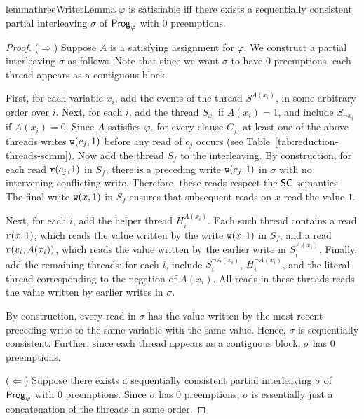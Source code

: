 \begin{restatable}{lemma}{threeWriterLemma}\label{lem:eth-sc}
    $\varphi$ is satisfiable iff there exists a sequentially consistent partial interleaving $\sigma$ of $\mathsf{Prog}_\varphi$ with $0$ preemptions.
\end{restatable}

\begin{proof}
    ($\Rightarrow$)
    Suppose $A$ is a satisfying assignment for $\varphi$. We construct a partial interleaving $\sigma$ as follows. Note that since we want $\sigma$ to have $0$ preemptions, each thread appears as a contiguous block.

    First, for each variable $x_i$, add the events of the thread $S^{A(x_i)}$, in some arbitrary order over $i$. 
    Next, for each $i$, add the thread $S_{x_i}$ if $A(x_i)=1$, and include $S_{\neg x_i}$ if $A(x_i)=0$. 
    Since $A$ satisfies $\varphi$, for every clause $C_j$, at least one of the above threads writes $\mathtt{w}(c_j,1)$ before any read of $c_j$ occurs (see Table~\ref{tab:reduction-threads-scmm}).
    Now add the thread $S_f$ to the interleaving. 
    By construction, for each read $\mathtt{r}(c_j,1)$ in $S_f$, there is a preceding write $\mathtt{w}(c_j,1)$ in $\sigma$ with no intervening conflicting write. Therefore, these reads respect the $\mathsf{SC}$ semantics. The final write $\mathtt{w}(x,1)$ in $S_f$ ensures that subsequent reads on $x$ read the value $1$.

    Next, for each $i$, add the helper thread $H_i^{A(x_i)}$. 
    Each such thread contains a read $\mathtt{r}(x,1)$, which reads the value written by the write $\mathtt{w}(x,1)$ in $S_f$, and a read $\mathtt{r}(v_i, A(x_i))$, which reads the value written by  the earlier write in $S_i^{A(x_i)}$.
    Finally, add the remaining threads: for each $i$, include $S_i^{\neg A(x_i)}$, $H_i^{\neg A(x_i)}$, and the literal thread corresponding to the negation of $A(x_i)$. All reads in these threads reads the value written by earlier writes in $\sigma$.

    By construction, every read in $\sigma$ has the value written by the most recent preceding write to the same variable with the same value. Hence, $\sigma$ is sequentially consistent. Further, since each thread appears as a contiguous block, $\sigma$ has $0$ preemptions.

    ($\Leftarrow$) Suppose there exists a sequentially consistent partial interleaving $\sigma$ of $\mathsf{Prog}_\varphi$ with $0$ preemptions.
    Since $\sigma$ has $0$ preemptions, $\sigma$ is essentially just a concatenation of the threads in some order. 


\end{proof}
